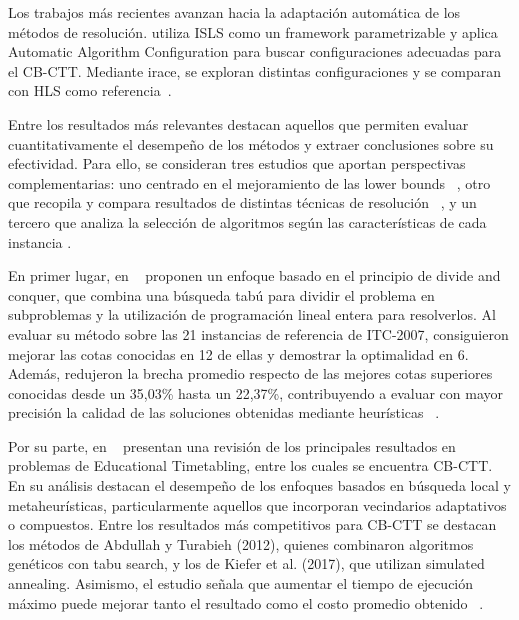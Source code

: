 \documentclass[letter, 10pt]{article}
\begin{document}
Los trabajos m\'as recientes avanzan hacia la adaptaci\'on autom\'atica de los m\'etodos de resoluci\'on. \cite{Feutrier2023Landscape} utiliza ISLS como un framework parametrizable y aplica Automatic Algorithm Configuration para buscar configuraciones adecuadas para el CB-CTT. Mediante irace, se exploran distintas configuraciones y se comparan con HLS como referencia~\cite{Feutrier2023Landscape}.



Entre los resultados m\'as relevantes destacan aquellos que permiten evaluar cuantitativamente el desempe\~no de los m\'etodos y extraer conclusiones sobre su efectividad. Para ello, se consideran tres estudios que aportan perspectivas complementarias: uno centrado en el mejoramiento de las lower bounds ~\cite{Hao2011LowerBounds}, otro que recopila y compara resultados de distintas t\'ecnicas de resoluci\'on  ~\cite{Ceschia2023Educational}, y un tercero que analiza la selecci\'on de algoritmos seg\'un las caracter\'isticas de cada instancia \cite{DeCoster2022AlgorithmSelection}.

En primer lugar, en ~\cite{Hao2011LowerBounds} proponen un enfoque basado en el principio de divide and conquer, que combina una b\'usqueda tab\'u para dividir el problema en subproblemas y la utilizaci\'on de programaci\'on lineal entera para resolverlos. Al evaluar su m\'etodo sobre las 21 instancias de referencia de ITC-2007, consiguieron mejorar las cotas conocidas en 12 de ellas y demostrar la optimalidad en 6. Adem\'as, redujeron la brecha promedio respecto de las mejores cotas superiores conocidas desde un 35,03\% hasta un 22,37\%, contribuyendo a evaluar con mayor precisi\'on la calidad de las soluciones obtenidas mediante heur\'isticas ~\cite{Hao2011LowerBounds}.

Por su parte, en  ~\cite{Ceschia2023Educational} presentan una revisi\'on de los principales resultados en problemas de Educational Timetabling, entre los cuales se encuentra CB-CTT. En su an\'alisis destacan el desempe\~no de los enfoques basados en b\'usqueda local y metaheur\'isticas, particularmente aquellos que incorporan vecindarios adaptativos o compuestos. Entre los resultados m\'as competitivos para CB-CTT se destacan los m\'etodos de Abdullah y Turabieh (2012), quienes combinaron algoritmos gen\'eticos con tabu search, y los de Kiefer et al. (2017), que utilizan simulated annealing. Asimismo, el estudio se\~nala que aumentar el tiempo de ejecuci\'on m\'aximo puede mejorar tanto el resultado como el costo promedio obtenido  ~\cite{Ceschia2023Educational}.
\end{document}

